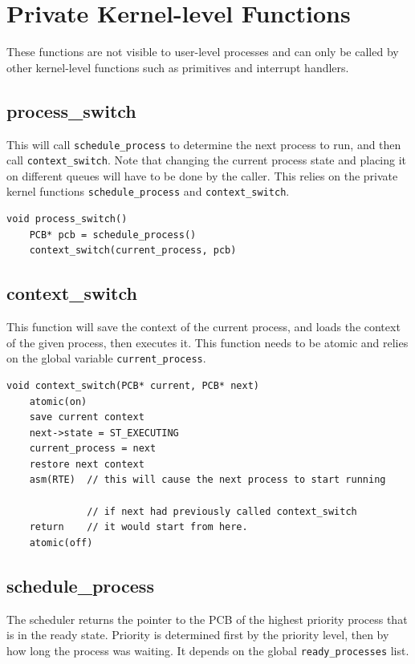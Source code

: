 \documentclass[titlepage]{article}
\begin{document}
\section{Private Kernel-level Functions}
These functions are not visible to user-level processes and can only be called
by other kernel-level functions such as primitives and interrupt handlers.

\subsection{process\_switch}
This will call \verb!schedule_process! to determine the next process to run, and
then call \verb!context_switch!. Note that changing the current process state
and placing it on different queues will have to be done by the caller. This
relies on the private kernel functions \verb!schedule_process! and
\verb!context_switch!.

\begin{verbatim}
void process_switch()
    PCB* pcb = schedule_process()
    context_switch(current_process, pcb)
\end{verbatim}

\subsection{context\_switch}
This function will save the context of the current process, and loads the
context of the given process, then executes it. This function needs to be atomic
and relies on the global variable \verb!current_process!.

\begin{verbatim}
void context_switch(PCB* current, PCB* next)
    atomic(on)
    save current context
    next->state = ST_EXECUTING
    current_process = next
    restore next context
    asm(RTE)  // this will cause the next process to start running

              // if next had previously called context_switch
    return    // it would start from here.
    atomic(off)
\end{verbatim}

\subsection{schedule\_process}
The scheduler returns the pointer to the PCB of the highest priority process
that is in the ready state. Priority is determined first by the priority level,
then by how long the process was waiting. It depends on the global
\verb!ready_processes! list.
\end{document}
